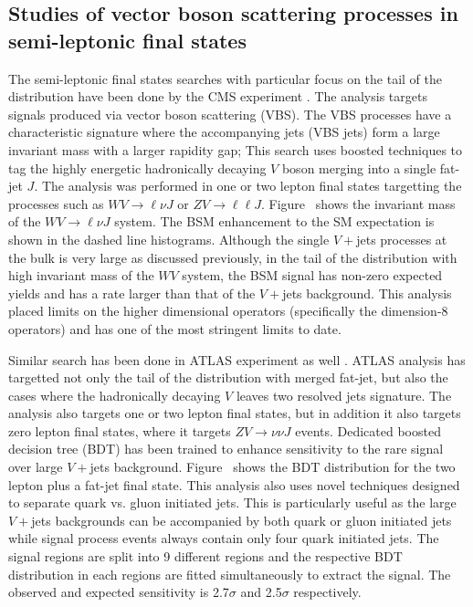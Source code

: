 \documentclass[10pt]{article}
\begin{document}
\subsection{Studies of vector boson scattering processes in semi-leptonic final states}

The semi-leptonic final states searches with particular focus on the tail of the distribution have been done by the CMS experiment \cite{}.
The analysis targets signals produced via vector boson scattering (VBS).
The VBS processes have a characteristic signature where the accompanying jets (VBS jets) form a large invariant mass with a larger rapidity gap;
This search uses boosted techniques to tag the highly energetic hadronically decaying $V$ boson merging into a single fat-jet $J$.
The analysis was performed in one or two lepton final states targetting the processes such as $WV\to \ell\nu J$ or $ZV\to \ell\ell J$.
Figure~ shows the invariant mass of the $WV\to\ell\nu J$ system.
The BSM enhancement to the SM expectation is shown in the dashed line histograms.
Although the single $V+$jets processes at the bulk is very large as discussed previously, in the tail of the distribution with high invariant mass of the $WV$ system, the BSM signal has non-zero expected yields and has a rate larger than that of the $V+$jets background.
This analysis placed limits on the higher dimensional operators (specifically the dimension-8 operators) and has one of the most stringent limits to date.

Similar search has been done in ATLAS experiment as well \cite{}.
ATLAS analysis has targetted not only the tail of the distribution with merged fat-jet, but also the cases where the hadronically decaying $V$ leaves two resolved jets signature.
The analysis also targets one or two lepton final states, but in addition it also targets zero lepton final states, where it targets $ZV\to \nu\nu J$ events.
Dedicated boosted decision tree (BDT) has been trained to enhance sensitivity to the rare signal over large $V+$jets background.
Figure~ shows the BDT distribution for the two lepton plus a fat-jet final state.
This analysis also uses novel techniques designed to separate quark vs. gluon initiated jets.
This is particularly useful as the large $V+$jets backgrounds can be accompanied by both quark or gluon initiated jets while signal process events always contain only four quark initiated jets.
The signal regions are split into 9 different regions and the respective BDT distribution in each regions are fitted simultaneously to extract the signal.
The observed and expected sensitivity is 2.7$\sigma$ and 2.5$\sigma$ respectively.
\end{document}
